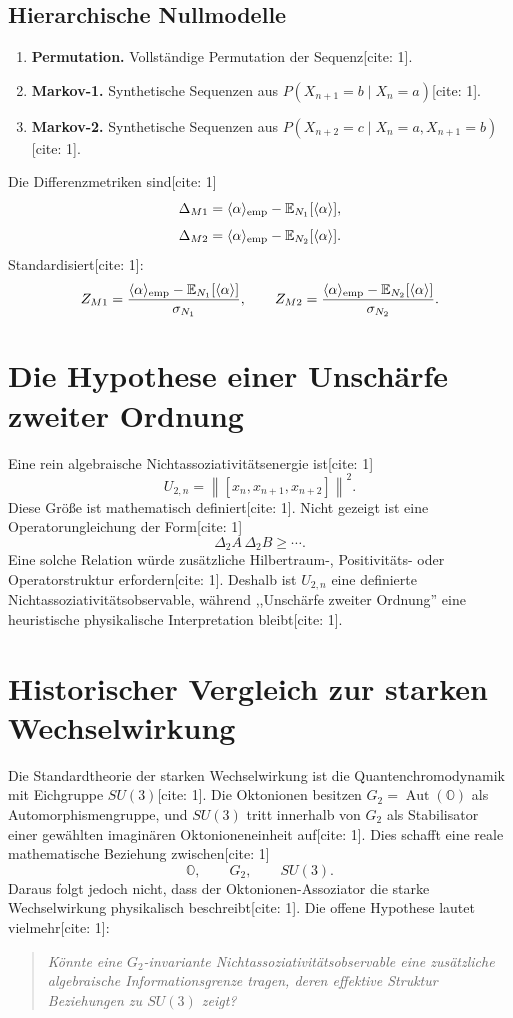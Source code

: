 \documentclass[11pt,a4paper]{article}
\newcommand{\OO}{\mathbb{O}}
\newcommand{\norm}[1]{\left\lVert #1 \right\rVert}
\newcommand{\Aut}{\operatorname{Aut}}
\begin{document}
	\subsection{Hierarchische Nullmodelle}
	\begin{enumerate}[label=\textbf{$N_{\arabic*}$:},start=0]
		\item \textbf{Permutation.} Vollständige Permutation der Sequenz[cite: 1].
		\item \textbf{Markov-1.} Synthetische Sequenzen aus $P(X_{n+1}=b\mid X_n=a)$[cite: 1].
		\item \textbf{Markov-2.} Synthetische Sequenzen aus $P(X_{n+2}=c\mid X_n=a,X_{n+1}=b)$[cite: 1].
	\end{enumerate}
	Die Differenzmetriken sind[cite: 1]
	\[
	\Delta_{M1}=\langle\alpha\rangle_{\rm emp}-\mathbb E_{N_1}[\langle\alpha\rangle],
	\]
	\[
	\Delta_{M2}=\langle\alpha\rangle_{\rm emp}-\mathbb E_{N_2}[\langle\alpha\rangle].
	\]
	Standardisiert[cite: 1]:
	\[
	Z_{M1}=\frac{\langle\alpha\rangle_{\rm emp}-\mathbb E_{N_1}[\langle\alpha\rangle]}{\sigma_{N_1}},\qquad
	Z_{M2}=\frac{\langle\alpha\rangle_{\rm emp}-\mathbb E_{N_2}[\langle\alpha\rangle]}{\sigma_{N_2}}.
	\]
	
	\section{Die Hypothese einer Unschärfe zweiter Ordnung}
	Eine rein algebraische Nichtassoziativitätsenergie ist[cite: 1]
	\[
	\boxed{U_{2,n}=\norm{[x_n,x_{n+1},x_{n+2}]}^2.}
	\]
	Diese Größe ist mathematisch definiert[cite: 1]. Nicht gezeigt ist eine Operatorungleichung der Form[cite: 1]
	\[
	\Delta_2A\,\Delta_2B\ge\cdots.
	\]
	Eine solche Relation würde zusätzliche Hilbertraum-, Positivitäts- oder Operatorstruktur erfordern[cite: 1]. Deshalb ist $U_{2,n}$ eine definierte Nichtassoziativitätsobservable, während ,,Unschärfe zweiter Ordnung'' eine heuristische physikalische Interpretation bleibt[cite: 1].
	
	\section{Historischer Vergleich zur starken Wechselwirkung}
	Die Standardtheorie der starken Wechselwirkung ist die Quantenchromodynamik mit Eichgruppe $SU(3)$[cite: 1]. Die Oktonionen besitzen $G_2=\Aut(\OO)$ als Automorphismengruppe, und $SU(3)$ tritt innerhalb von $G_2$ als Stabilisator einer gewählten imaginären Oktonioneneinheit auf[cite: 1]. Dies schafft eine reale mathematische Beziehung zwischen[cite: 1]
	\[
	\OO,\qquad G_2,\qquad SU(3).
	\]
	Daraus folgt jedoch nicht, dass der Oktonionen-Assoziator die starke Wechselwirkung physikalisch beschreibt[cite: 1]. Die offene Hypothese lautet vielmehr[cite: 1]:
	\begin{quote}
		\emph{Könnte eine $G_2$-invariante Nichtassoziativitätsobservable eine zusätzliche algebraische Informationsgrenze tragen, deren effektive Struktur Beziehungen zu $SU(3)$ zeigt?}
	\end{quote}
	
\end{document}

